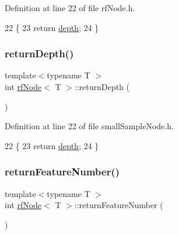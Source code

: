 Definition at line 22 of file rf\+Node.\+h.


\begin{DoxyCode}
22                                 \{
23             \textcolor{keywordflow}{return} \hyperlink{classrfNode_a7cb8fb854d8ec90635bd7207d8b8c31e}{depth};
24         \}
\end{DoxyCode}
\mbox{\label{classrfNode_a0e95db0d0008bf347f53343cbcd5a38e}} 
\subsubsection{\texorpdfstring{return\+Depth()}{returnDepth()}\hspace{0.1cm}{\footnotesize\ttfamily [2/2]}}
{\footnotesize\ttfamily template$<$typename T $>$ \\
int \hyperlink{classrfNode}{rf\+Node}$<$ T $>$\+::return\+Depth (\begin{DoxyParamCaption}{ }\end{DoxyParamCaption})\hspace{0.3cm}{\ttfamily [inline]}}



Definition at line 22 of file small\+Sample\+Node.\+h.


\begin{DoxyCode}
22                                 \{
23             \textcolor{keywordflow}{return} \hyperlink{classrfNode_a7cb8fb854d8ec90635bd7207d8b8c31e}{depth};
24         \}
\end{DoxyCode}
\mbox{\label{classrfNode_a060b06548e267392449252e14e9edab1}} 
\subsubsection{\texorpdfstring{return\+Feature\+Number()}{returnFeatureNumber()}\hspace{0.1cm}{\footnotesize\ttfamily [1/2]}}
{\footnotesize\ttfamily template$<$typename T $>$ \\
int \hyperlink{classrfNode}{rf\+Node}$<$ T $>$\+::return\+Feature\+Number (\begin{DoxyParamCaption}{ }\end{DoxyParamCaption})\hspace{0.3cm}{\ttfamily [inline]}}



